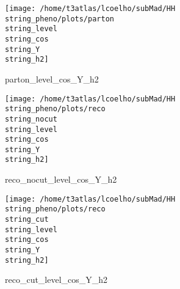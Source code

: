 \documentclass[a4paper,onecolumn,final,11pt]{article}
\begin{document}
\begin{figure}[H] 
\centering 
\begin{minipage}{.32\textwidth} 
        \centering 
        \hspace{0cm} 
        \texttt{[image: /home/t3atlas/lcoelho/subMad/HH\\string\_pheno/plots/parton\\string\_level\\string\_cos\\string\_Y\\string\_h2]} 
        \caption{parton_level_cos_Y_h2} 
\end{minipage} 
\hfill 
\begin{minipage}{.32\textwidth} 
        \centering 
        \hspace{0cm} 
    \texttt{[image: /home/t3atlas/lcoelho/subMad/HH\\string\_pheno/plots/reco\\string\_nocut\\string\_level\\string\_cos\\string\_Y\\string\_h2]} 
        \caption{reco_nocut_level_cos_Y_h2} 
\end{minipage} 
\hfill 
\begin{minipage}{.32\textwidth} 
        \centering 
        \hspace{0cm} 
    \texttt{[image: /home/t3atlas/lcoelho/subMad/HH\\string\_pheno/plots/reco\\string\_cut\\string\_level\\string\_cos\\string\_Y\\string\_h2]} 
        \caption{reco_cut_level_cos_Y_h2} 
\end{minipage} 
\end{figure} 
 
\end{document}
